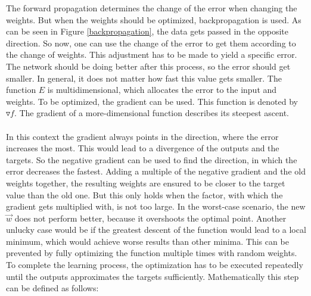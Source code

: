 \documentclass[12pt]{article}
\begin{document}
The forward propagation determines the change of the error when changing the weights. But when the weights should be optimized, backpropagation is used. As can be seen in Figure \ref{backpropagation}, the data gets passed in the opposite direction. So now, one can use the change of the error to get them according to the change of weights. This adjustment has to be made to yield a specific error. \\
The network should be doing better after this process, so the error should get smaller. In general, it does not matter how fast this value gets smaller. The function $E$ is multidimensional, which allocates the error to the input and weights. To be optimized, the \gls{gradient} can be used. This function is denoted by $\triangledown f$.  The \gls{gradient} of a more-dimensional function describes its steepest ascent. \cite{grad} \\\\
In this context the \gls{gradient} always points in the direction, where the error increases the most. This would lead to a \gls{divergence} of the \glspl{output} and the \glspl{target}. So the negative \gls{gradient} can be used to find the direction, in which the error decreases the fastest. Adding a multiple of the negative \gls{gradient} and the old \glspl{weight} together, the resulting \glspl{weight} are ensured to be closer to the target value than the old one. But this only holds when the factor, with which the \gls{gradient} gets multiplied with, is not too large. In the worst-case scenario, the new $\vec{w}$ does not perform better, because it overshoots the optimal point. Another unlucky case would be if the greatest descent of the function would lead to a local \gls{minimum}, which would achieve worse results than other minima. This can be prevented by fully optimizing the function multiple times with random \glspl{weight}. \\
To complete the learning process, the optimization has to be executed repeatedly until the \glspl{output} approximates the \glspl{target} sufficiently. Mathematically this step can be defined as follows:
\end{document}
